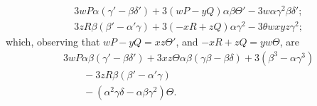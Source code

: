 \documentclass[11pt]{article}
\begin{document}
\begin{align*}
& 3wP\alpha(\gamma' - \beta\delta') + 3(wP - yQ)\alpha\beta\Theta' - 3w\alpha\gamma^2\beta\delta';\\
& 3zR\beta(\beta' - \alpha'\gamma) + 3(-xR + zQ)\alpha\gamma^2 - 3\theta wxyz\gamma^2;
\end{align*}
which, observing that $wP - yQ = xz\Theta'$, and $-xR + zQ = yw\Theta$, are
\begin{align*}
& 3wP\alpha\beta(\gamma' - \beta\delta') + 3xz\Theta\alpha\beta(\gamma\beta - \beta\delta) + 3(\beta^3 - \alpha\gamma^3)\\
& \qquad - 3zR\beta(\beta' - \alpha'\gamma)\\
& \qquad - (\alpha^2\gamma\delta - \alpha\beta\gamma^2)\Theta.
\end{align*}

\vfill
\end{document}
